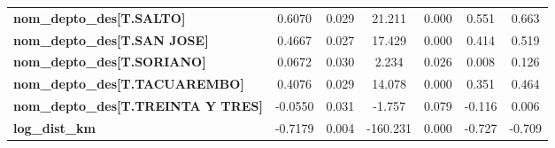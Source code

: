 \begin{center}
\begin{tabular}{lcccccc}
\textbf{nom\_depto\_des[T.SALTO]}          &       0.6070  &        0.029     &    21.211  &         0.000        &        0.551    &        0.663     \\
\textbf{nom\_depto\_des[T.SAN JOSE]}       &       0.4667  &        0.027     &    17.429  &         0.000        &        0.414    &        0.519     \\
\textbf{nom\_depto\_des[T.SORIANO]}        &       0.0672  &        0.030     &     2.234  &         0.026        &        0.008    &        0.126     \\
\textbf{nom\_depto\_des[T.TACUAREMBO]}     &       0.4076  &        0.029     &    14.078  &         0.000        &        0.351    &        0.464     \\
\textbf{nom\_depto\_des[T.TREINTA Y TRES]} &      -0.0550  &        0.031     &    -1.757  &         0.079        &       -0.116    &        0.006     \\
\textbf{log\_dist\_km}                     &      -0.7179  &        0.004     &  -160.231  &         0.000        &       -0.727    &       -0.709     \\
\bottomrule
\end{tabular}
\end{center}